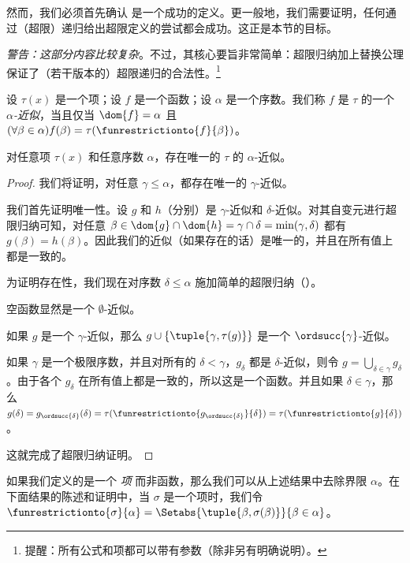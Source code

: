 \documentclass[../../../include/open-logic-section]{subfiles}
\begin{document}

然而，我们必须首先确认  是一个成功的定义。更一般地，我们需要证明，任何通过（超限）递归给出超限定义的尝试都会成功。这正是本节的目标。

\emph{警告：这部分内容比较复杂}。不过，其核心要旨非常简单：超限归纳加上替换公理保证了（若干版本的）超限递归的合法性。\footnote{提醒：所有公式和项都可以带有参数（除非另有明确说明）。}

\begin{defn}
	设 $\tau(x)$ 是一个项；设 $f$ 是一个函数；设 $\alpha$ 是一个序数。我们称 $f$ 是 $\tau$ 的一个 \emph{$\alpha$-近似}，当且仅当 $\dom{f} = \alpha$ 且 $(\forall \beta \in \alpha)f(\beta) = \tau(\funrestrictionto{f}{\beta})$。
\end{defn}

\begin{lem}[有界递归]
对任意项 $\tau(x)$ 和任意序数 $\alpha$，存在唯一的 $\tau$ 的 $\alpha$-近似。
\end{lem}
\begin{proof}
我们将证明，对任意 $\gamma \leq \alpha$，都存在唯一的 $\gamma$-近似。

我们首先证明唯一性。设 $g$ 和 $h$（分别）是 $\gamma$-近似和 $\delta$-近似。对其自变元进行超限归纳可知，对任意 $\beta \in \dom{g} \cap \dom{h} =
\gamma \cap \delta = \min(\gamma, \delta)$ 都有 $g(\beta) = h(\beta)$。因此我们的近似（如果存在的话）是唯一的，并且在所有值上都是一致的。

为证明存在性，我们现在对序数 $\delta \leq \alpha$ 施加简单的超限归纳（）。

空函数显然是一个 $\emptyset$-近似。

如果 $g$ 是一个 $\gamma$-近似，那么 $g \cup
\{\tuple{\gamma, \tau(g)}\}$ 是一个 $\ordsucc{\gamma}$-近似。

如果 $\gamma$ 是一个极限序数，并且对所有的 $\delta < \gamma$，$g_\delta$ 都是 $\delta$-近似，则令 $g = \bigcup_{\delta \in \gamma} g_\delta$。由于各个 $g_\delta$ 在所有值上都是一致的，所以这是一个函数。并且如果 $\delta \in \gamma$，那么 $g(\delta) = g_{\ordsucc{\delta}}(\delta) = \tau(\funrestrictionto{g_{\ordsucc{\delta}}}{\delta}) = \tau(\funrestrictionto{g}{\delta})$。

这就完成了超限归纳证明。
\end{proof}

如果我们定义的是一个 \emph{项} 而非函数，那么我们可以从上述结果中去除界限 $\alpha$。在下面结果的陈述和证明中，当 $\sigma$ 是一个项时，我们令 $\funrestrictionto{\sigma}{\alpha} = \Setabs{\tuple{\beta,
\sigma(\beta)}}{\beta \in \alpha}$。
\end{document}
